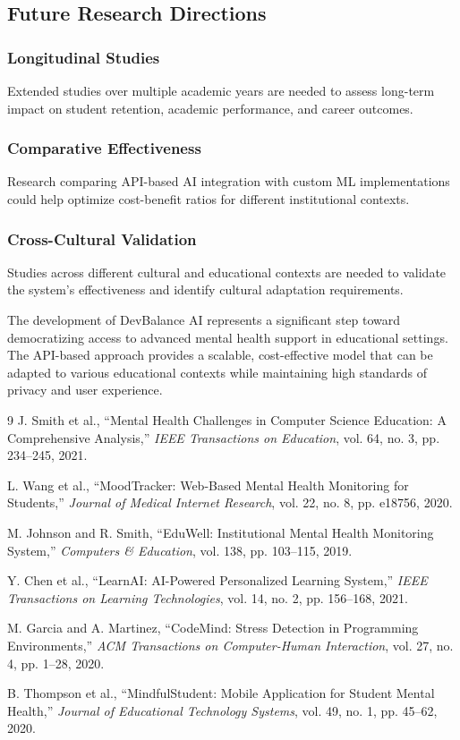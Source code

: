 \documentclass[conference,10pt]{IEEEtran}
\begin{document}
\subsection{Future Research Directions}

\subsubsection{Longitudinal Studies}

Extended studies over multiple academic years are needed to assess long-term impact on student retention, academic performance, and career outcomes.

\subsubsection{Comparative Effectiveness}

Research comparing API-based AI integration with custom ML implementations could help optimize cost-benefit ratios for different institutional contexts.

\subsubsection{Cross-Cultural Validation}

Studies across different cultural and educational contexts are needed to validate the system's effectiveness and identify cultural adaptation requirements.

The development of DevBalance AI represents a significant step toward democratizing access to advanced mental health support in educational settings. The API-based approach provides a scalable, cost-effective model that can be adapted to various educational contexts while maintaining high standards of privacy and user experience.

\begin{thebibliography}{9}
J. Smith et al., ``Mental Health Challenges in Computer Science Education: A Comprehensive Analysis,'' \emph{IEEE Transactions on Education}, vol. 64, no. 3, pp. 234--245, 2021.

L. Wang et al., ``MoodTracker: Web-Based Mental Health Monitoring for Students,'' \emph{Journal of Medical Internet Research}, vol. 22, no. 8, pp. e18756, 2020.

M. Johnson and R. Smith, ``EduWell: Institutional Mental Health Monitoring System,'' \emph{Computers \& Education}, vol. 138, pp. 103--115, 2019.

Y. Chen et al., ``LearnAI: AI-Powered Personalized Learning System,'' \emph{IEEE Transactions on Learning Technologies}, vol. 14, no. 2, pp. 156--168, 2021.

M. Garcia and A. Martinez, ``CodeMind: Stress Detection in Programming Environments,'' \emph{ACM Transactions on Computer-Human Interaction}, vol. 27, no. 4, pp. 1--28, 2020.

B. Thompson et al., ``MindfulStudent: Mobile Application for Student Mental Health,'' \emph{Journal of Educational Technology Systems}, vol. 49, no. 1, pp. 45--62, 2020.
\end{thebibliography}
\end{document}

